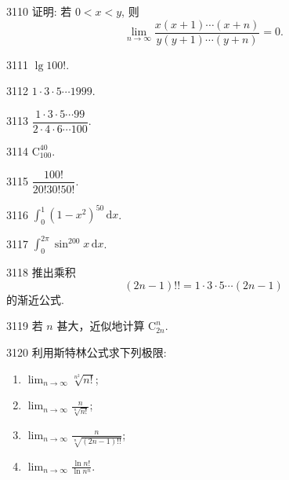 \begin{prob}[M]{3110}
证明: 若 $0 < x < y$, 则
\[
\lim_{n \to \infty} \frac{x(x+1)\cdots(x+n)}{y(y+1)\cdots(y+n)} = 0.
\]
\end{prob}



\begin{prob}[S]{3111}
$\lg 100!$.
\end{prob}

\begin{prob}[S]{3112}
$1 \cdot 3 \cdot 5 \cdots 1999$.
\end{prob}

\begin{prob}[S]{3113}
$\dfrac{1 \cdot 3 \cdot 5 \cdots 99}{2 \cdot 4 \cdot 6 \cdots 100}$.
\end{prob}

\begin{prob}[S]{3114}
$\mathrm{C}_{100}^{40}$.
\end{prob}

\begin{prob}[S]{3115}
$\dfrac{100!}{20!30!50!}$.
\end{prob}

\begin{prob}[S]{3116}
$\displaystyle\int_{0}^{1} (1 - x^2)^{50} \,\mathrm{d}x$.
\end{prob}

\begin{prob}[S]{3117}
$\displaystyle\int_{0}^{2\pi} \sin^{200} x \,\mathrm{d}x$.
\end{prob}

\begin{prob}[M]{3118}
推出乘积
\[
(2n - 1)!! = 1 \cdot 3 \cdot 5 \cdots (2n - 1)
\]
的渐近公式.
\end{prob}

\begin{prob}[S]{3119}
若 $n$ 甚大，近似地计算 $\mathrm{C}_{2n}^{n}$.
\end{prob}

\begin{prob}[L]{3120}
利用斯特林公式求下列极限:
\begin{enumerate}[label=(\alph*), itemsep=2pt, topsep=3pt]
\item $\displaystyle\lim_{n \to \infty} \sqrt[n^2]{n!}$;
\item $\displaystyle\lim_{n \to \infty} \frac{n}{\sqrt[n]{n!}}$;
\item $\displaystyle\lim_{n \to \infty} \frac{n}{\sqrt[n]{(2n-1)!!}}$;
\item $\displaystyle\lim_{n \to \infty} \frac{\ln n!}{\ln n^n}$.
\end{enumerate}
\end{prob}

